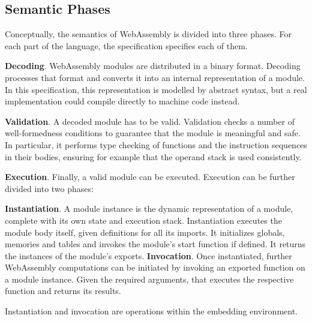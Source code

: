\subsection{Semantic Phases} \mbox{}

\indent Conceptually, the semantics of WebAssembly is divided into three phases. For each part of the language, the specification specifies each of them.

\textbf{Decoding}. WebAssembly modules are distributed in a binary format. 
                   Decoding processes that format and converts it into an internal representation of a module. 
                   In this specification, this representation is modelled by abstract syntax, but a real implementation could compile directly to machine code instead.
  
\textbf{Validation}. A decoded module has to be valid. 
                     Validation checks a number of well-formedness conditions to guarantee that the module is meaningful and safe. In particular, it performs type checking of functions and the instruction sequences in their bodies, ensuring for example that the operand stack is used consistently.

\textbf{Execution}. Finally, a valid module can be executed. Execution can be further divided into two phases:

\textbf{Instantiation}. A module instance is the dynamic representation of a module, complete with its own state and execution stack. 
                        Instantiation executes the module body itself, given definitions for all its imports. 
                        It initializes globals, memories and tables and invokes the module’s start function if defined. 
                        It returns the instances of the module’s exports.
\textbf{Invocation}. Once instantiated, further WebAssembly computations can be initiated by invoking an exported function on a module instance. 
                     Given the required arguments, that executes the respective function and returns its results.

Instantiation and invocation are operations within the embedding environment.

